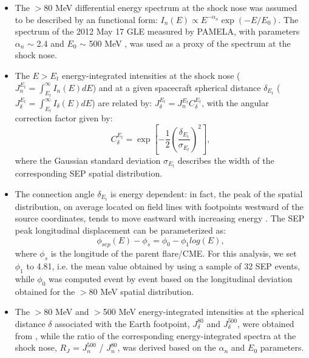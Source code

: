 \documentclass{aastex61}
\begin{document}
\begin{itemize}
\item The $>$80 MeV differential energy spectrum at the shock nose was assumed to be described by an \citet{ref:ER1985} functional form: $I_{n}(E) \propto E^{-\alpha_{n}}\exp(-E/E_{0})$. The spectrum of the 2012 May 17 GLE measured by PAMELA, with parameters $\alpha_{n}$ $\sim$ 2.4 and $E_{0}$ $\sim$ 500 MeV \citep{ref:BRUNO2018}, was used as a proxy of the spectrum at the shock nose.
\item The $E>E_{t}$ energy-integrated intensities at the shock nose ($J_{n}^{E_{t}}=\int_{E_{t}}^{\infty} I_{n}(E) dE$) and at a given spacecraft spherical distance $\delta_{E_{t}}$ ($J_{\delta}^{E_{t}}=\int_{E_{t}}^{\infty} I_{\delta}(E) dE$) are related by:     
$J_{\delta}^{E_{t}} = J_{n}^{E_{t}}C_{\delta}^{E_{t}}$, 
with the angular correction factor given by:
\begin{equation}    
C_{\delta}^{E_{t}} = \exp\left[-\frac{1}{2}\left(\frac{\delta_{E_{t}}}{\sigma_{E_{t}}}\right)^{2}\right],
\end{equation}
where the Gaussian standard deviation $\sigma_{E_{t}}$ describes the width of the corresponding SEP spatial distribution. 
\item The connection angle $\delta_{E_{t}}$ is energy dependent: in fact, the peak of the spatial distribution, on average located on field lines with footpoints westward of the source coordinates, tends to move eastward with increasing energy \citep{ref:BRUNORICHARDSON2021}. 
The SEP peak longitudinal displacement can be parameterized as: 
\begin{equation}\label{eq:longitudinal_shift}    
\phi_{sep}(E) - \phi_{s} = \phi_{0} - \phi_{1} log(E),
\end{equation}
where $\phi_{s}$ is the longitude of the parent flare/CME. 
For this analysis, we set $\phi_{1}$ to 4.81, i.e. the mean value obtained by \citet{ref:BRUNORICHARDSON2021} using a sample of 32 SEP events, while $\phi_{0}$ was computed event by event based on the longitudinal deviation obtained for the $>$80 MeV spatial distribution.
\item The $>$80 MeV and $>$500 MeV energy-integrated intensities at the spherical distance $\delta$ associated with the Earth footpoint, $J_{\delta}^{80}$ and $J_{\delta}^{500}$, were obtained from \citet{ref:DENOLFO2019}, while the ratio of the corresponding energy-integrated spectra at the shock nose, $R_{J}$ = $J_{n}^{500}$ / $J_{n}^{80}$, was derived based on the $\alpha_{n}$ and $E_{0}$ parameters.

\end{itemize}
\end{document}
